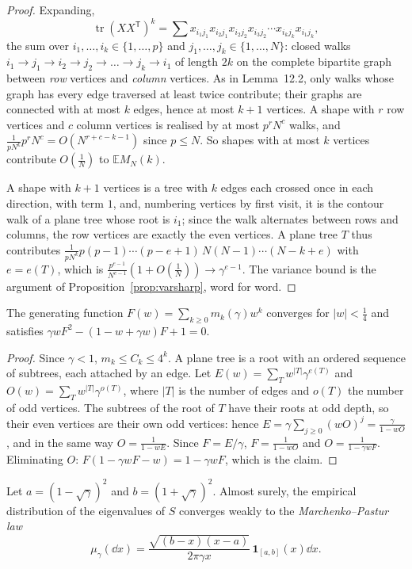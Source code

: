 \begin{proof}
Expanding,
\[
\operatorname{tr}(XX^{\mathsf T})^k=\sum x_{i_1j_1}x_{i_2j_1}x_{i_2j_2}x_{i_3j_2}\cdots x_{i_kj_k}x_{i_1j_k},
\]
the sum over $i_1,\dots,i_k\in\{1,\dots,p\}$ and $j_1,\dots,j_k\in\{1,\dots,N\}$: closed walks $i_1\to j_1\to i_2\to j_2\to\dots\to j_k\to i_1$ of length $2k$ on the complete bipartite graph between \emph{row} vertices and \emph{column}
vertices. As in Lemma~12.2, only walks whose graph has every edge traversed at least twice contribute; their graphs are connected with at most $k$ edges, hence at most $k+1$ vertices. A shape with $r$ row
vertices and $c$ column vertices is realised by at most $p^rN^c$ walks, and $\frac1{pN^k}p^rN^c=O(N^{r+c-k-1})$ since $p\le N$. So shapes with at most $k$ vertices contribute $O(\frac1N)$ to $\mathbb EM_N(k)$.

A shape with $k+1$ vertices is a tree with $k$ edges each crossed once in each direction, with term $1$, and, numbering vertices by first visit, it is the contour walk of a plane tree whose root is $i_1$; since the walk
alternates between rows and columns, the row vertices are exactly the even vertices. A plane tree $T$ thus contributes $\frac{1}{pN^k}p(p-1)\cdots(p-e+1)\,N(N-1)\cdots(N-k+e)$ with $e=e(T)$, which is
$\frac{p^{e-1}}{N^{e-1}}(1+O(\frac1N))\to\gamma^{e-1}$. The variance bound is the argument of Proposition~\ref{prop:varsharp}, word for word.
\end{proof}

\begin{lemma}\label{lem:mpgf}
The generating function $F(w)=\sum_{k\ge0}m_k(\gamma)w^k$ converges for $|w|<\frac14$ and satisfies $\gamma wF^2-(1-w+\gamma w)F+1=0$.
\end{lemma}

\begin{proof}
Since $\gamma<1$, $m_k\le C_k\le4^k$. A plane tree is a root with an ordered sequence of subtrees, each attached by an edge. Let $E(w)=\sum_Tw^{|T|}\gamma^{e(T)}$ and $O(w)=\sum_Tw^{|T|}\gamma^{o(T)}$, where $|T|$ is the number of edges and
$o(T)$ the number of odd vertices. The subtrees of the root of $T$ have their roots at odd depth, so their even vertices are their own odd vertices: hence $E=\gamma\sum_{j\ge0}(wO)^j=\frac\gamma{1-wO}$, and in the same way
$O=\frac1{1-wE}$. Since $F=E/\gamma$, $F=\frac1{1-wO}$ and $O=\frac1{1-\gamma wF}$. Eliminating $O$: $F(1-\gamma wF-w)=1-\gamma wF$, which is the claim.
\end{proof}

\begin{theorem}\label{thm:mp}
Let $a=(1-\sqrt\gamma)^2$ and $b=(1+\sqrt\gamma)^2$. Almost surely, the empirical distribution of the eigenvalues of $S$ converges weakly to the \emph{Marchenko--Pastur law}
\[
\mu_\gamma(\dd x)=\frac{\sqrt{(b-x)(x-a)}}{2\pi\gamma x}\,\mathbf 1_{[a,b]}(x)\dd x.
\]
\end{theorem}

